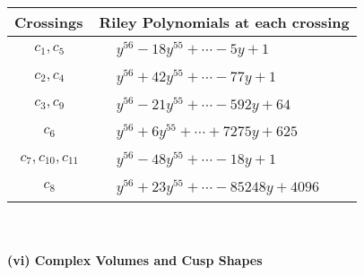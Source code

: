 \documentclass[1p]{elsarticle_modified}
\theoremstyle{definition}
\begin{document}
\begin{tabular}{m{50pt}|m{274pt}}
Crossings & \hspace{64pt}Riley Polynomials at each crossing \\
\hline $$\begin{aligned}c_{1},c_{5}\end{aligned}$$&$\begin{aligned}
&y^{56}-18 y^{55}+\cdots-5 y+1
\end{aligned}$\\
\hline $$\begin{aligned}c_{2},c_{4}\end{aligned}$$&$\begin{aligned}
&y^{56}+42 y^{55}+\cdots-77 y+1
\end{aligned}$\\
\hline $$\begin{aligned}c_{3},c_{9}\end{aligned}$$&$\begin{aligned}
&y^{56}-21 y^{55}+\cdots-592 y+64
\end{aligned}$\\
\hline $$\begin{aligned}c_{6}\end{aligned}$$&$\begin{aligned}
&y^{56}+6 y^{55}+\cdots+7275 y+625
\end{aligned}$\\
\hline $$\begin{aligned}c_{7},c_{10},c_{11}\end{aligned}$$&$\begin{aligned}
&y^{56}-48 y^{55}+\cdots-18 y+1
\end{aligned}$\\
\hline $$\begin{aligned}c_{8}\end{aligned}$$&$\begin{aligned}
&y^{56}+23 y^{55}+\cdots-85248 y+4096
\end{aligned}$\\
\hline
\end{tabular}\\~\\
\newpage\flushleft \textbf{(vi) Complex Volumes and Cusp Shapes}
\end{document}
